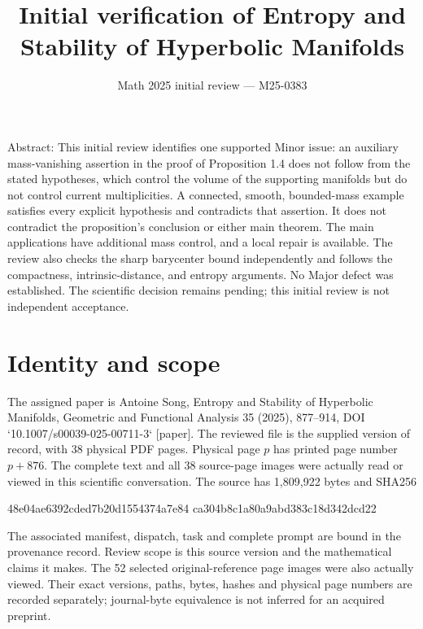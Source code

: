 \documentclass[10pt]{article}
\title{Initial verification of
Entropy and Stability of Hyperbolic Manifolds}
\author{}
\date{Math 2025 initial review — M25-0383}
\begin{document}
\maketitle
Abstract: This initial review identifies one supported Minor issue: an auxiliary mass-vanishing assertion in the proof of Proposition 1.4 does not follow from the stated hypotheses, which control the volume of the supporting manifolds but do not control current multiplicities. A connected, smooth, bounded-mass example satisfies every explicit hypothesis and contradicts that assertion. It does not contradict the proposition’s conclusion or either main theorem. The main applications have additional mass control, and a local repair is available. The review also checks the sharp barycenter bound independently and follows the compactness, intrinsic-distance, and entropy arguments. No Major defect was established. The scientific decision remains pending; this initial review is not independent acceptance.\par
\section*{Identity and scope}
The assigned paper is Antoine Song, Entropy and Stability of Hyperbolic Manifolds, Geometric and Functional Analysis 35 (2025), 877–914, DOI `10.1007/s00039-025-00711-3` [paper]. The reviewed file is the supplied version of record, with 38 physical PDF pages. Physical page \(p\) has printed page number \(p+876\). The complete text and all 38 source-page images were actually read or viewed in this scientific conversation. The source has 1,809,922 bytes and SHA256\par
48e04ae6392cded7b20d1554374a7e84
ca304b8c1a80a9abd383c18d342dcd22\par
The associated manifest, dispatch, task and complete prompt are bound in the provenance record. Review scope is this source version and the mathematical claims it makes. The 52 selected original-reference page images were also actually viewed. Their exact versions, paths, bytes, hashes and physical page numbers are recorded separately; journal-byte equivalence is not inferred for an acquired preprint.\par
\end{document}
